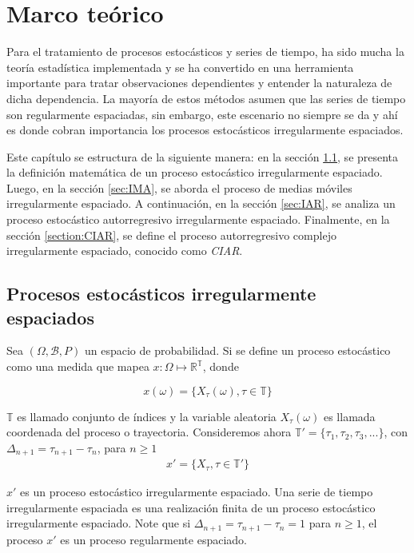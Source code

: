 \chapter{Marco teórico}
Para el tratamiento de procesos estocásticos y series de tiempo, ha sido mucha la teoría estadística implementada y se ha convertido en una herramienta importante para tratar observaciones dependientes y entender la naturaleza de dicha dependencia. La mayoría de estos métodos asumen que las series de tiempo son regularmente espaciadas, sin embargo, este escenario no siempre se da y ahí es donde cobran importancia los procesos estocásticos irregularmente espaciados.


Este capítulo se estructura de la siguiente manera: en la sección \ref{sec:definicion}, se presenta la definición matemática de un proceso estocástico irregularmente espaciado. Luego, en la sección \ref{sec:IMA}, se aborda el proceso de medias móviles irregularmente espaciado. A continuación, en la sección \ref{sec:IAR}, se analiza un proceso estocástico autorregresivo irregularmente espaciado. Finalmente, en la sección \ref{section:CIAR}, se define el proceso autorregresivo complejo irregularmente espaciado, conocido como \emph{CIAR}.
\section{Procesos estocásticos irregularmente espaciados}
\label{sec:definicion}
Sea $(\Omega,\mathscr{B},P)$ un espacio de probabilidad. Si se define un proceso estocástico como una medida 
que mapea $x: \Omega \mapsto \mathbb{R}^{\mathbb{T}}$, donde 

$$x(\omega)= \lbrace X_{\tau}(\omega), \tau \in \mathbb{T}\rbrace$$

$\mathbb{T}$ es llamado conjunto de índices y la variable aleatoria $X_{\tau}(\omega)$ es llamada coordenada 
del proceso o trayectoria. Consideremos ahora $\mathbb{T}'= \lbrace \tau_1,\tau_2, \tau_3,... \rbrace$, 
con $\Delta_{n+1}=\tau_{n+1}-\tau_{n}$, para $n\geq 1$
\begin{align}
	x'= \lbrace X_{\tau}, \tau \in \mathbb{T}'\rbrace	
\end{align}

$x'$ es un proceso estocástico irregularmente espaciado. Una serie de tiempo irregularmente espaciada es una 
realización finita de un proceso estocástico irregularmente espaciado. Note que si  $\Delta_{n+1}=\tau_{n+1}-\tau_{n}=1$ 
para $n \geq 1$, el proceso $x'$ es un proceso regularmente espaciado.




